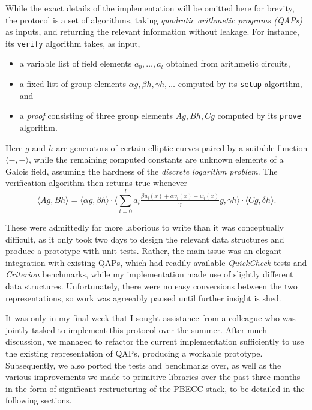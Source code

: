 \documentclass[11pt]{article}
\begin{document}
While the exact details of the implementation will be omitted here for brevity, the protocol is a set of algorithms, taking \emph{quadratic arithmetic programs (QAPs)} \cite{qap} as inputs, and returning the relevant information without leakage. For instance, its \texttt{verify} algorithm takes, as input,
\begin{itemize}
\item a variable list of field elements $ a_0, \dots, a_l $ obtained from arithmetic circuits,
\item a fixed list of group elements $ \alpha g, \beta h, \gamma h, \dots $ computed by its \texttt{setup} algorithm, and
\item a \emph{proof} consisting of three group elements $ Ag, Bh, Cg $ computed by its \texttt{prove} algorithm.
\end{itemize}
Here $ g $ and $ h $ are generators of certain elliptic curves paired by a suitable function $ \langle -, - \rangle $, while the remaining computed constants are unknown elements of a Galois field, assuming the hardness of the \emph{discrete logarithm problem}. The verification algorithm then returns true whenever
$$ \langle Ag, Bh \rangle = \langle \alpha g, \beta h \rangle \cdot \langle \textstyle{\sum_{i = 0}^l} a_i\tfrac{\beta u_i(x) + \alpha v_i(x) + w_i(x)}{\gamma}g, \gamma h \rangle \cdot \langle Cg, \delta h \rangle. $$

These were admittedly far more laborious to write than it was conceptually difficult, as it only took two days to design the relevant data structures and produce a prototype with unit tests. Rather, the main issue was an elegant integration with existing QAPs, which had readily available \emph{QuickCheck} tests and \emph{Criterion} benchmarks, while my implementation made use of slightly different data structures. Unfortunately, there were no easy conversions between the two representations, so work was agreeably paused until further insight is shed.

It was only in my final week that I sought assistance from a colleague who was jointly tasked to implement this protocol over the summer. After much discussion, we managed to refactor the current implementation sufficiently to use the existing representation of QAPs, producing a workable prototype. Subsequently, we also ported the tests and benchmarks over, as well as the various improvements we made to primitive libraries over the past three months in the form of significant restructuring of the PBECC stack, to be detailed in the following sections.
\end{document}
